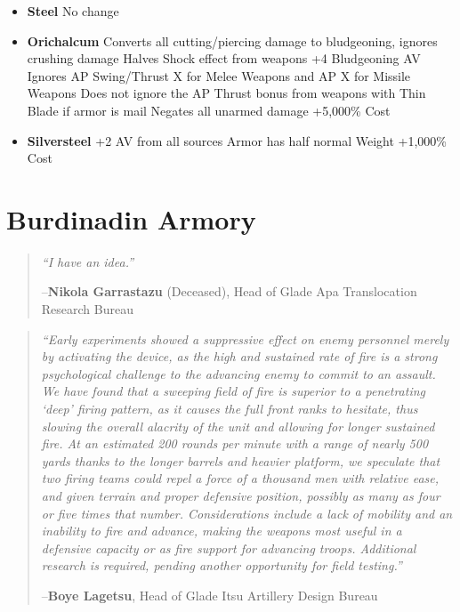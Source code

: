 \documentclass[oneside,11pt,english]{book}
\begin{document}
\begin{itemize}
\item [] \textbf{Steel}
  \subitem No change
\end{itemize}

\begin{itemize}
\item [] \textbf{Orichalcum}
  \subitem Converts all cutting/piercing damage to bludgeoning, ignores crushing damage
  \subitem Halves Shock effect from weapons
  \subitem +4 Bludgeoning AV
  \subitem Ignores AP Swing/Thrust X for Melee Weapons and AP X for Missile Weapons
  \subsubitem Does not ignore the AP Thrust bonus from weapons with Thin Blade if armor is mail
  \subitem Negates all unarmed damage
  \subitem +5,000\% Cost
\end{itemize}

\begin{itemize}
\item [] \textbf{Silversteel}
  \subitem +2 AV from all sources
  \subitem Armor has half normal Weight 
  \subitem +1,000\% Cost
\end{itemize}

\chapter{Burdinadin Armory}\label{ch:Burdinadin Armory}
\startcontents[chapters]
\clearpage
\begin{quote}
  
  \emph{“I have an idea.”}\par
  \hfill --\textbf{Nikola Garrastazu} (Deceased), Head of Glade Apa Translocation Research Bureau
\end{quote}
\begin{quote}
  \emph{“Early experiments showed a suppressive effect on enemy personnel merely
    by activating the device, as the high and sustained rate of fire is a strong
    psychological challenge to the advancing enemy to commit to an assault. We
    have found that a sweeping field of fire is superior to a penetrating ‘deep’
    firing pattern, as it causes the full front ranks to hesitate, thus slowing
    the overall alacrity of the unit and allowing for longer sustained fire. At
    an estimated 200 rounds per minute with a range of nearly 500 yards thanks
    to the longer barrels and heavier platform, we speculate that two firing
    teams could repel a force of a thousand men with relative ease, and given
    terrain and proper defensive position, possibly as many as four or five
    times that number. Considerations include a lack of mobility and an
    inability to fire and advance, making the weapons most useful in a defensive
    capacity or as fire support for advancing troops. Additional research is
    required, pending another opportunity for field testing.”}

  \hfill --\textbf{Boye Lagetsu}, Head of Glade Itsu Artillery Design Bureau 
\end{quote}
\end{document}
